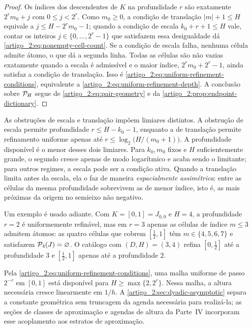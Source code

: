 \begin{proof}
Os índices dos descendentes de $K$ na profundidade $r$ são exatamente
$2^rm_0+j$ com $0\le j<2^r$. Como $m_0\ge0$, a condição de translação
$|m|+1\le H$ equivale a $j\le H-2^rm_0-1$; quando a condição de escala
$k_0+r+1\le H$ vale, contar os inteiros $j\in\{0,\ldots,2^r-1\}$ que
satisfazem essa desigualdade dá \eqref{artigo_2:eq:nonempty-cell-count}. Se a condição
de escala falha, nenhuma célula admite átomo, o que dá a segunda linha.
Todas as células são não vazias exatamente quando a escala é admissível e o
maior índice, $2^rm_0+2^r-1$, ainda satisfaz a condição de translação. Isso é
\eqref{artigo_2:eq:uniform-refinement-conditions}, equivalente a
\eqref{artigo_2:eq:uniform-refinement-depth}. A conclusão sobre $\mathcal{P}_H$ segue de
\eqref{artigo_2:eq:pair-geometry} e da \cref{artigo_2:prop:endpoint-dictionary}.
\end{proof}

\begin{remark}\label{map:artigo_2:4.6}
\label{artigo_2:rem:asymmetry}
As obstruções de escala e translação impõem limiares distintos. A obstrução de escala permite profundidade
$r\le H-k_0-1$, enquanto a de translação permite refinamento uniforme apenas
até $r\le\log_2\bigl(H/(m_0+1)\bigr)$. A profundidade disponível é o menor
desses dois limiares. Para $k_0,m_0$ fixos e $H$ suficientemente grande, o
segundo cresce apenas de modo logarítmico e acaba sendo o limitante; para
outros regimes, a escala pode ser a condição ativa. Quando a translação
limita antes da escala, ela o faz de maneira \emph{espacialmente assimétrica}:
entre as células da mesma profundidade sobrevivem as de menor índice, isto é,
as mais próximas da origem no semieixo não negativo.

Um exemplo é usado adiante. Com $K=[0,1]=J_{0,0}$ e $H=4$, a profundidade
$r=2$ é uniformemente refinável, mas em $r=3$ apenas as células de índice
$m\le3$ admitem átomos: as quatro células que cobrem $[\tfrac12,1]$ têm
$m\in\{4,5,6,7\}$ e satisfazem $\mathcal{P}_4(J)=\varnothing$. O catálogo com
$(D,H)=(3,4)$ refina $[0,\tfrac12]$ até a profundidade $3$ e
$[\tfrac12,1]$ apenas até a profundidade $2$.

Pela \eqref{artigo_2:eq:uniform-refinement-conditions}, uma malha uniforme de passo
$2^{-r}$ em $[0,1]$ está disponível para
$H\ge\max\{2,2^r\}$. Nessa malha, a altura necessária cresce linearmente em $1/h$. A \cref{artigo_2:sec:dyadic-asymptotic} separa a constante geométrica sem
truncagem da agenda necessária para realizá-la; as
seções de classes de aproximação e agendas de altura da Parte~IV incorporam esse acoplamento
aos estratos de aproximação.
\end{remark}

